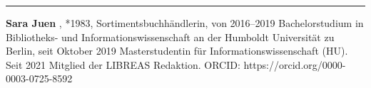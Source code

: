 \begin{center}\rule{0.5\linewidth}{0.5pt}\end{center}

\textbf{Sara Juen} , *1983, Sortimentsbuchhändlerin, von 2016--2019
Bachelorstudium in Bibliotheks- und Informationswissenschaft an der
Humboldt Universität zu Berlin, seit Oktober 2019 Masterstudentin für
Informationswissenschaft (HU). Seit 2021 Mitglied der LIBREAS Redaktion.
ORCID: https://orcid.org/0000-0003-0725-8592
